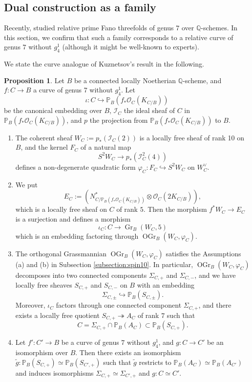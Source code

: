 \documentclass[autodetect-engine, a4paper]{amsart}
\theoremstyle{definition}
\newtheorem{prop}[thm]{Proposition}
\def\P{{\mathbb P}}
\def\Q{{\mathbb Q}}
\def\cO{\mathcal{O}}
\DeclareMathOperator\Gr{\mathrm{Gr}}
\DeclareMathOperator\OGr{\mathrm{OGr}}
\newcommand{\cred}{\color{black}}
\newcommand{\cora}{\color{black}}
\begin{document}
\subsection{Dual construction as a family}
Recently, \cite{Kuznetsovfamily} studied relative prime Fano threefolds of genus $7$ over $\Q$-schemes.
In this section, we confirm that such a family corresponds to a relative curve of genus $7$ without $g_4^1$ (although it might be well-known to experts).

We state the curve analogue of Kuznetsov's result in the following.

\begin{prop}
\label{prop:curvesigmafamily}
Let $B$ be a {\cred connected locally Noetherian} {\cora $\Q$-}scheme, and $f \colon C \rightarrow B$ a curve of genus 7 without $g_4^1.$
Let
\[
\iota \colon
C \hookrightarrow \P_{B}(f_{\ast} \cO_{C} (K_{C/B}))
\]
be the canonical embedding over $B$, {\cred $\mathcal{I}_{C}$ the ideal sheaf of $C$ in $\P_{B}(f_{\ast} \cO_{C} (K_{C/B}))$,} and $p$ the projection from $\P_{B}(f_{\ast} \cO_{C} (K_{C/B}))$ to $B$.
\begin{enumerate}
\item
The coherent sheaf $W_C :=p_{\ast} (\mathcal{I}_{C} (2))$ is a locally free sheaf of rank 10 on $B$, and the kernel $F_C$ of a natural map
\[
S^2 W_C \rightarrow p_{\ast} (\mathcal{I}_{C}^{2} (4)) 
\]
{\cred defines a non-degenerate quadratic form $\varphi_{C} \colon F_{C} \hookrightarrow S^2 W_{C}$ on $W_{C}^{\vee}$.}
\item
We put 
\[
E_C:= (N_{C/\P_{B}(f_{\ast}\cO_{C} (K_{C/B}))}^{\ast} \otimes \cO_{C} (2 K_{C/B})),
\]
which is a locally free sheaf on $C$ of rank $5$.
Then the morphism $f^{\ast} W_C \rightarrow E_C$ is a surjection and
defines a morphism 
\[
\iota_{C} \colon C \rightarrow \Gr_B (W_C,5) 
\]
which is an embedding factoring through $\OGr_B (W_C, \varphi_{C})$.
\item
The orthogonal Grassmannian $\OGr_B (W_C, \varphi_{C})$ satisfies the Assumptions (a) and (b) in Subsection \ref{subsection:spin10}. In particular, $\OGr_B (W_{C}, \varphi_{C})$ decomposes into two connected components $\Sigma_{C,+}$ and $\Sigma_{C,-}$, and we have locally free sheaves $S_{C,+}$ and $S_{C,-}$ on $B$ with an embedding
\[
\Sigma_{C, \pm} \hookrightarrow \P_{B}(S_{C,\pm}).
\]
Moreover, $\iota_{C}$ factors through one connected component $\Sigma_{C,+}$, and there exists a locally free quotient $S_{C,+} \twoheadrightarrow A_{C}$ of rank $7$ such that 
\[
C = \Sigma_{C,+} \cap \P_{B} (A_{C}) \subset \P_{B} (S_{C,+}).
\]
\item 
Let $f' \colon C' \rightarrow B$ be a curve of genus $7$ without $g_4^1$, and $g \colon C \rightarrow C'$ be an isomorphism over $B$.
Then there exists an isomorphism $\widetilde{g} \colon \P_{B} (S_{C, +}) \simeq \P_{B} (S_{C',+})$ such that $\widetilde{g}$ restricts to $\P_{B}(A_{C}) \simeq \P_{B}(A_{C'})$ and induces isomorphisms $\Sigma_{C,+} \simeq \Sigma_{C',+}$ and $g \colon C \simeq C'$.
\end{enumerate}
\end{prop}
\end{document}
